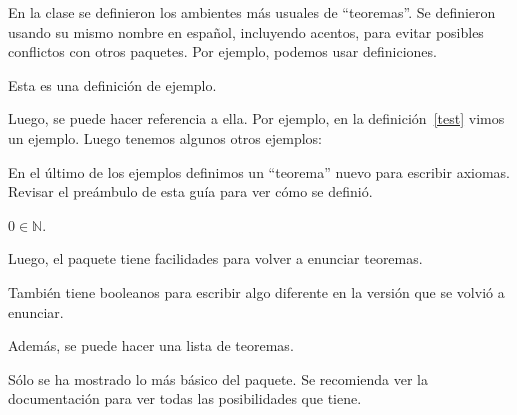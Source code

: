 En la clase se definieron los ambientes más usuales de \enquote{teoremas}. Se
definieron usando su mismo nombre en español, incluyendo acentos, para evitar
posibles conflictos con otros paquetes. Por ejemplo, podemos usar definiciones.

\begin{definición}[label=test]
  Esta es una definición de ejemplo.  
\end{definición}

Luego, se puede hacer referencia a ella. Por ejemplo, en la
definición~\ref{test} vimos un ejemplo. Luego tenemos algunos otros ejemplos:

\begin{lema}
  \lipsum[1][1]
\end{lema}

\begin{teorema}[store=teo]
  \lipsum[1][2]
\end{teorema}

\begin{corolario}
  \lipsum[1][3]
\end{corolario}

\begin{proposición}
  \lipsum[1][4]
\end{proposición}

\begin{observación}[store=obs]
   \lipsum[1][5]
\end{observación}

En el último de los ejemplos definimos un \enquote{teorema} nuevo para escribir
axiomas. Revisar el preámbulo de esta guía para ver cómo se definió.

\begin{ax}[note=Peano]
  \(0\in\mathbb{N}\).
\end{ax}

Luego, el paquete tiene facilidades para volver a enunciar teoremas.


También tiene booleanos para escribir algo diferente en la versión que se volvió
a enunciar.


Además, se puede hacer una lista de teoremas.

\listofkeytheorems

Sólo se ha mostrado lo más básico del paquete. Se recomienda ver la
documentación para ver todas las posibilidades que tiene.


